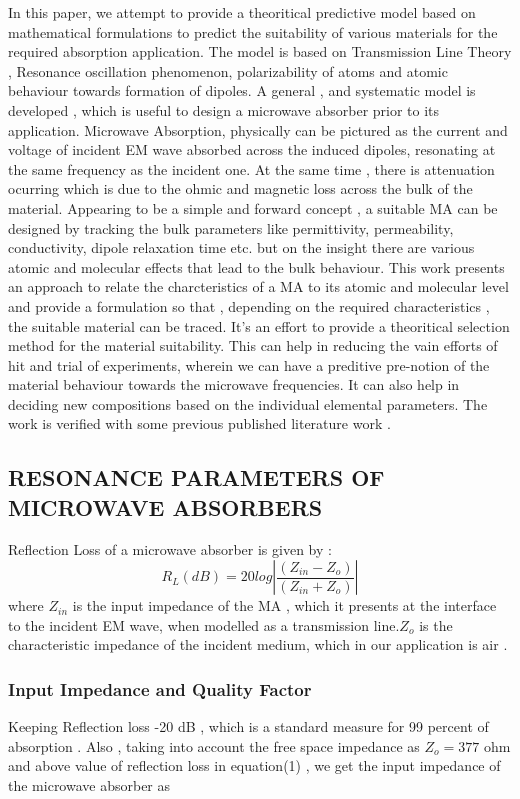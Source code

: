 \documentclass[journal]{IEEEtran}
\begin{document}
In this paper, we attempt to provide a theoritical predictive model based on mathematical formulations to predict the suitability of various materials for the required absorption application. The model is based on Transmission Line Theory , Resonance oscillation phenomenon, polarizability of atoms and atomic behaviour towards formation of dipoles. A general , and systematic model is developed , which is useful to design a microwave absorber prior to its application. Microwave Absorption, physically can be pictured as the current and voltage of incident EM wave absorbed across the induced dipoles, resonating at the same frequency as the incident one. At the same time , there is attenuation ocurring which is due to the ohmic and magnetic loss across the bulk of the material. Appearing to be a simple and forward concept , a suitable MA can be designed by tracking the bulk parameters like permittivity, permeability, conductivity, dipole relaxation time etc. but on the insight there are various atomic and molecular effects that lead to the bulk behaviour. This work presents an approach to relate the charcteristics of a MA to its atomic and molecular level and provide a formulation so that , depending on the required characteristics , the suitable material can be traced. It's an effort to provide a theoritical selection method for the material suitability. This can help in reducing the vain efforts of hit and trial of experiments, wherein we can have a preditive pre-notion of the material behaviour towards the microwave frequencies. It can also help in deciding new compositions based on the individual elemental parameters. The work is verified with some previous published literature work . 

\subsection{RESONANCE PARAMETERS OF MICROWAVE ABSORBERS}
Reflection Loss of a microwave absorber is given by :
\begin{equation}
 R_L(dB) = 20log|\frac{(Z_{in} - Z_o)}{(Z_{in} + Z_o)}| \label{eq1}
\end{equation}
where $ Z_{in} $  is the input impedance of the MA , which it presents at the interface to the incident EM wave, when modelled as a transmission line.$ Z_o$ is the characteristic impedance of the incident medium, which in our application is air \cite{r1} \cite{r2}.

\subsubsection{Input Impedance and Quality Factor}
Keeping Reflection loss -20 dB , which is a standard measure for 99 percent  of absorption .
Also , taking into account the free space impedance as $ Z_o = 377  $ ohm and above value of  reflection loss in equation(1) , we get the input impedance of the microwave absorber as 
\end{document}
